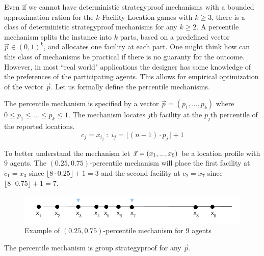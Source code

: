Even if we cannot have deterministic strategyproof mechanisms with a bounded approximation ration for the $k$-Facility Location games with $k\ge3$, there is a class of deterministic strategyproof mechanisms \cite{Sui2013}  for any $k\ge2$. A percentile mechanism splits the instance into $k$ parts, based on a predefined vector $\vec{p} \in (0,1)^k$, and allocates one facility at each part. One might think how can this class of mechanisms be practical if there is no guaranty for the outcome. However, in most ``real world" applications the designer has some knowledge of the preferences of the participating agents. This allows for empirical optimization of the vector $\vec{p}$. Let us formally define the percentile mechanisms.

\begin{definition}
The percentile mechanism is specified by a vector $\vec{p}=(p_1,...,p_k)$ where $0\le p_1\le...\le p_k \le 1$. The mechanism locates $j$th facility at the $p_j$th percentile of the reported locations. 
\[ c_j = x_{i_j}\; :\; i_j = \lfloor (n-1)\cdot p_j \rfloor +1 \]

\end{definition}

To better understand the mechanism let $\vec{x} = (x_1,...,x_9)$ be a location profile with $9$ agents. The $(0.25,0.75)$-percentile mechanism will place the first facility at $c_1=x_3$ since $\lfloor 8\cdot 0.25 \rfloor +1  = 3$ and the second facility at $c_2=x_7$ since $\lfloor 8\cdot 0.75 \rfloor +1 = 7$. 


\begin{figure}[ht]
    \centering
    \includegraphics[width=12cm]{Images/percentile.png}
    \caption{Example of $(0.25,0.75)$-percentile mechanism for 9 agents}
    \label{fig:percentileExample}
\end{figure}

\begin{lemma}
The percentile mechanism is group strategyproof for any $\vec{p}$.
\end{lemma}

